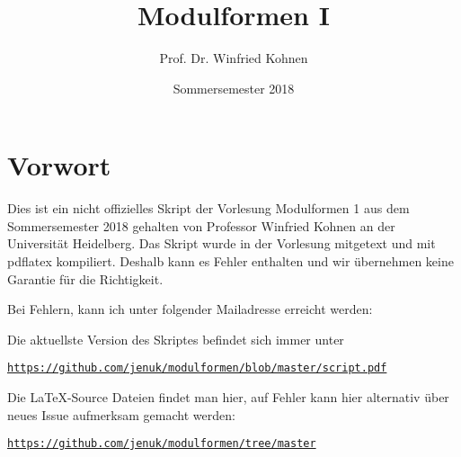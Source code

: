 \documentclass[parskip=half]{scrbook}
\title{Modulformen I}
\author{Prof. Dr. Winfried Kohnen}
\date{Sommersemester 2018}
\begin{document}
\pagestyle{plain}

\maketitle

\chapter*{Vorwort}

Dies ist ein nicht offizielles Skript der Vorlesung Modulformen 1 aus dem Sommersemester 2018 gehalten von Professor Winfried Kohnen an der Universität Heidelberg.
Das Skript wurde in der Vorlesung mitgetext und mit pdflatex kompiliert.
Deshalb kann es Fehler enthalten und wir übernehmen keine Garantie für die Richtigkeit.

Bei Fehlern, kann ich unter folgender Mailadresse erreicht werden:

\begin{center}
\end{center}

Die aktuellste Version des Skriptes befindet sich immer unter
\begin{center}
\texttt{\url{https://github.com/jenuk/modulformen/blob/master/script.pdf}}
\end{center}

Die \LaTeX-Source Dateien findet man hier, auf Fehler kann hier alternativ über neues Issue aufmerksam gemacht werden:
\begin{center}
\texttt{\url{https://github.com/jenuk/modulformen/tree/master}}
\end{center}

\clearpage
{}
{}
\tableofcontents

\clearpage
{}
\setcounter{page}{0}
\pagestyle{fancy}










\printindex

\cleardoublepage
{}
{}
\listoftheorems[ignoreall, onlynamed={satz,satz-list,satz-noind,satz-ind}]
\end{document}
